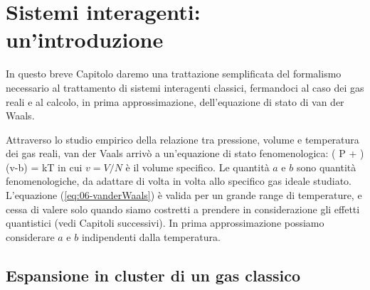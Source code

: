 \chapter{Sistemi interagenti: un'introduzione}
\label{cap:interagenti}

In questo breve Capitolo daremo una trattazione semplificata del formalismo necessario al trattamento di sistemi interagenti classici, fermandoci al caso dei gas reali e al calcolo, in prima approssimazione, dell'equazione di stato di van der Waals.

Attraverso lo studio empirico della relazione tra pressione, volume e temperatura dei gas reali, van der Vaals arrivò a un'equazione di stato fenomenologica:
\be
\label{eq:06-vanderWaals}
\left(
P + 
\right)(v-b) = kT
\ee
in cui $v = V/N$ è il volume specifico. Le quantità $a$ e $b$ sono quantità fenomenologiche, da adattare di volta in volta allo specifico gas ideale studiato. L'equazione (\ref{eq:06-vanderWaals}) è valida per un grande range di temperature, e cessa di valere solo quando siamo costretti a prendere in considerazione gli effetti quantistici (vedi Capitoli successivi). In prima approssimazione possiamo considerare $a$ e $b$ indipendenti dalla temperatura.

\section{Espansione in cluster di un gas classico}

